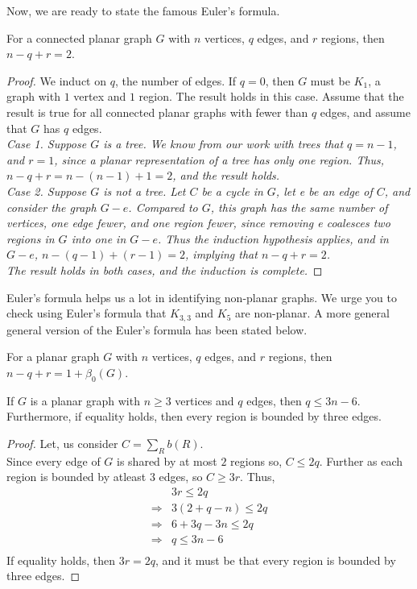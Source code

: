 \documentclass[../basic_graph_theory.tex]{subfiles}
\begin{document}
Now, we are ready to state the famous Euler's formula.
\begin{thm}
    For a connected planar graph $G$ with $n$ vertices, $q$ edges, and $r$ regions, then $n-q+r=2$.
\end{thm}
\begin{proof}
    We induct on $q$, the number of edges. If $q = 0$, then $G$ must be $K_1$, a graph with $1$ vertex and $1$ region. The result holds in this case. Assume that the result is true for all connected planar graphs with fewer than $q$ edges, and assume that $G$ has $q$ edges.\\
    \em{Case 1.} Suppose $G$ is a tree. We know from our work with trees that $q = n-1$, and $r = 1$, since a planar representation of a tree has only one region. Thus, $n - q + r = n - (n - 1) + 1 = 2$, and the result holds.\\
    \em{Case 2.} Suppose $G$ is not a tree. Let $C$ be a cycle in $G$, let e be an edge of $C$, and consider the graph $G - e$. Compared to $G$, this graph has the same number of vertices, one edge fewer, and one region fewer, since removing e coalesces two regions in $G$ into one in $G - e$. Thus the induction hypothesis applies, and in $G - e$, $n - (q - 1) + (r - 1) = 2$, implying that $n - q + r = 2$.\\
    The result holds in both cases, and the induction is complete.
\end{proof}

Euler's formula helps us a lot in identifying non-planar graphs. We urge you to check using Euler's formula that $K_{3,3}$ and $K_5$ are non-planar. A more general general version of the Euler's formula has been stated below.

\begin{thm}
    For a planar graph $G$ with $n$ vertices, $q$ edges, and $r$ regions, then $n-q+r=1+\beta_{0}(G)$.
\end{thm}

\begin{thm}
    If $G$ is a planar graph with $n \ge 3$ vertices and $q$ edges, then $q \le 3n - 6$. Furthermore, if equality holds, then every region is bounded by three edges.
\end{thm}
\begin{proof}
    Let, us consider $C=\sum_{R}b(R)$.\\
    Since every edge of $G$ is shared by at most $2$ regions so, $C \le 2q$. Further as each region is bounded by atleast $3$ edges, so $C \ge 3r$. Thus,\\
    \begin{align*}
        &3r \le 2q\\
        \Longrightarrow &3(2+q-n) \le 2q\\
        \Longrightarrow &6+3q-3n \le 2q\\
        \Longrightarrow &q \le 3n-6\\
    \end{align*}
    If equality holds, then $3r = 2q$, and it must be that every region is bounded by three edges.
\end{proof}
\end{document}
